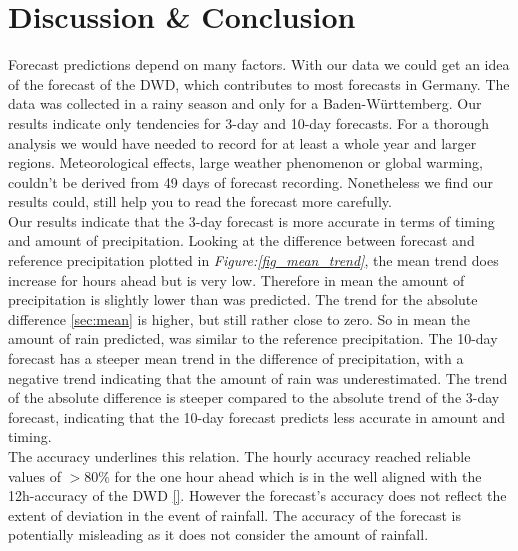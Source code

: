 \documentclass{article}
\theoremstyle{plain}
\theoremstyle{definition}
\theoremstyle{remark}
\begin{document}
\section{Discussion \& Conclusion}\label{sec:conclusion}
Forecast predictions depend on many factors. With our data we could get an idea of the forecast of the DWD, which contributes to most forecasts in Germany. %
The data was collected in a rainy season and only for a Baden-Württemberg. %
Our results indicate only tendencies for 3-day and 10-day forecasts. For a thorough analysis we would have needed to record for at least a whole year and larger regions. Meteorological effects, large weather phenomenon or global warming, couldn't be derived from 49 days of forecast recording. %
Nonetheless we find our results could, still help you to read the forecast more carefully.\\ %
Our results indicate that the 3-day forecast is more accurate in terms of timing and amount of precipitation.  %
Looking at the difference between forecast and reference precipitation plotted in \textit{Figure:\ref{fig_mean_trend}}, the mean trend does increase for hours ahead but is very low.  %
Therefore in mean the amount of precipitation is slightly lower than was predicted. The trend for the absolute difference \ref{sec:mean} is higher, but still rather close to zero. %
So in mean the amount of rain predicted, was %
similar to the reference precipitation. The 10-day forecast has a steeper mean trend in the difference of precipitation, with a negative trend indicating that the amount of rain was underestimated. The trend of the absolute difference is steeper compared to the absolute trend of the 3-day forecast, indicating that the 10-day forecast predicts less accurate in amount and timing. \\  %
The accuracy underlines this relation.
The hourly accuracy reached reliable values of $>80\%$ for the one hour ahead which is in the well aligned with the 12h-accuracy of the DWD \ref{}. However the forecast's accuracy does not reflect the extent of deviation in the event of rainfall. The accuracy of the forecast is potentially misleading as it does not consider the amount of rainfall. \\
\end{document}
